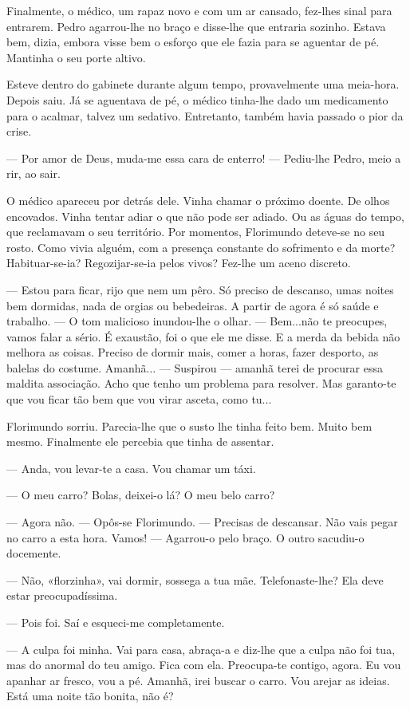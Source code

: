 Finalmente, o médico, um rapaz novo e com um ar cansado, fez-lhes sinal
para entrarem. Pedro agarrou-lhe no braço e disse-lhe que entraria
sozinho. Estava bem, dizia, embora visse bem o esforço que ele fazia
para se aguentar de pé. Mantinha o seu porte altivo.

Esteve dentro do gabinete durante algum tempo, provavelmente uma
meia-hora. Depois saiu. Já se aguentava de pé, o médico tinha-lhe dado
um medicamento para o acalmar, talvez um sedativo. Entretanto, também
havia passado o pior da crise.

--- Por amor de Deus, muda-me essa cara de enterro! --- Pediu-lhe Pedro,
meio a rir, ao sair.

O médico apareceu por detrás dele. Vinha chamar o próximo doente. De
olhos encovados. Vinha tentar adiar o que não pode ser adiado. Ou as
águas do tempo, que reclamavam o seu território. Por momentos,
Florimundo deteve-se no seu rosto. Como vivia alguém, com a presença
constante do sofrimento e da morte? Habituar-se-ia? Regozijar-se-ia
pelos vivos? Fez-lhe um aceno discreto.

--- Estou para ficar, rijo que nem um pêro. Só preciso de descanso, umas
noites bem dormidas, nada de orgias ou bebedeiras. A partir de agora é
só saúde e trabalho. --- O tom malicioso inundou-lhe o olhar. --- Bem...não
te preocupes, vamos falar a sério. É exaustão, foi o que ele me disse. E
a merda da bebida não melhora as coisas. Preciso de dormir mais, comer a
horas, fazer desporto, as balelas do costume. Amanhã... --- Suspirou ---
amanhã terei de procurar essa maldita associação. Acho que tenho um
problema para resolver. Mas garanto-te que vou ficar tão bem que vou
virar asceta, como tu...

Florimundo sorriu. Parecia-lhe que o susto lhe tinha feito bem. Muito
bem mesmo. Finalmente ele percebia que tinha de assentar.

--- Anda, vou levar-te a casa. Vou chamar um táxi.

--- O meu carro? Bolas, deixei-o lá? O meu belo carro?

--- Agora não. --- Opôs-se Florimundo. --- Precisas de descansar. Não vais
pegar no carro a esta hora. Vamos! --- Agarrou-o pelo braço. O outro
sacudiu-o docemente.

--- Não, «florzinha», vai dormir, sossega a tua mãe. Telefonaste-lhe? Ela
deve estar preocupadíssima.

--- Pois foi. Saí e esqueci-me completamente.

--- A culpa foi minha. Vai para casa, abraça-a e diz-lhe que a culpa não
foi tua, mas do anormal do teu amigo. Fica com ela. Preocupa-te contigo,
agora. Eu vou apanhar ar fresco, vou a pé. Amanhã, irei buscar o carro.
Vou arejar as ideias. Está uma noite tão bonita, não é?

